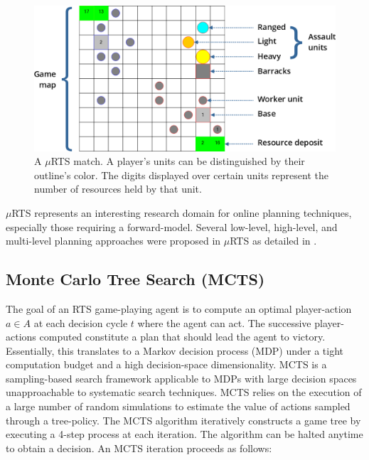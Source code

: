 \documentclass[conference]{IEEEtran}
\newcommand{\mRTS}{$\mu$RTS}
\begin{document}

\begin{figure}[t]
\begin{center}
	\includegraphics[scale=1]{figs/mRTS.png}
	\caption{A \mRTS{} match. A player's units can be distinguished by their outline's color. The digits displayed over certain units represent the number of resources held by that unit.}
	\label{mRTSScreenshot}
\end{center}
\end{figure}

\mRTS{} represents an interesting research domain for online planning techniques, especially those requiring a forward-model. Several low-level, high-level, and multi-level planning approaches were proposed in \mRTS{} as detailed in \cite{ouessai_online_2019}.


\subsection{Monte Carlo Tree Search (MCTS)}

The goal of an RTS game-playing agent is to compute an optimal player-action $a \in A$ at each decision cycle $t$ where the agent can act. The successive player-actions computed constitute a plan that should lead the agent to victory. Essentially, this translates to a Markov decision process (MDP) under a tight computation budget and a high decision-space dimensionality. MCTS is a sampling-based search framework applicable to MDPs with large decision spaces unapproachable to systematic search techniques. MCTS relies on the execution of a large number of random simulations to estimate the value of actions sampled through a tree-policy. The MCTS algorithm iteratively constructs a game tree by executing a 4-step process at each iteration. The algorithm can be halted anytime to obtain a decision. An MCTS iteration proceeds as follows:
\end{document}
